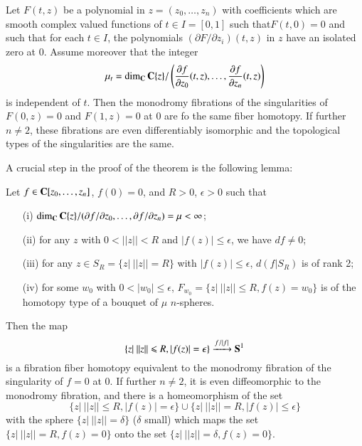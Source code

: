 \begin{thm}\label{art10-thm2.1}
Let $F(t,z)$ be a polynomial in $z = (z_0, \ldots, z_n)$ with coefficients which are smooth complex valued functions of $t \in I = [0,1]$ such that\pageoriginale $F(t, 0) =0$ and such that for each $t \in I$, the polynomials $(\partial F/ \partial z_i) (t,z)$ in $z$ have an isolated zero at 0. Assume moreover that the integer
$$
\mu_t = \dim_{\mathbf{C}} \mathbf{C} \{z\} / \left(\frac{\partial f}{\partial z_0} (t,z) , \ldots, \frac{\partial f}{\partial z_n} (t,z) \right)
$$
is independent of $t$. Then the monodromy fibrations of the singularities of $F (0,z)=0$ and $F(1,z) =0$ at 0 are fo the same fiber homotopy. If further $n \neq 2$, these fibrations are even differentiably isomorphic and the topological types of the singularities are the same.
\end{thm}

A crucial step in the proof of the theorem is the following lemma:

\begin{lemma}\label{art10-lem2.2}
Let $f \in \mathbf{C}[z_0, \ldots, z_n]$, $f(0) =0$, and $R >0$, $\epsilon > 0$ such that 
\begin{itemize}
\item[\rm (i)] $\dim_{\mathbf{C}} \mathbf{C} \{z\} / (\partial f / \partial z_0, \ldots, \partial f / \partial z_n) = \mu < \infty$;

\item[\rm (ii)] for any $z$ with $0 <  ||z|| < R$ and $|f(z)| \leqslant \epsilon$, we have $df\neq 0$;

\item[\rm (iii)] for any $z \in S_R = \{z |~ ||z|| = R\}$ with $|f(z)| \leqslant \epsilon$, $d (f|S_R)$ is of rank 2;

\item[\rm (iv)] for some $w_0$ with $0 < |w_0|\leqslant \epsilon$, $F_{w_0} = \{z| ~ ||z|| \leqslant R, f(z) = w_0\}$ is of the homotopy type of a bouquet of $\mu$ $n$-spheres.
 \end{itemize}

Then the map
\begin{equation}
\{z | ~ ||z|| \leqslant R, |f(z)| = \epsilon \} \xrightarrow{f/|f|} \mathbf{S}^1 \label{art10-A}
\end{equation}
is a fibration fiber homotopy equivalent to the monodromy fibration of the singularity of $f=0$ at 0. If further $n \neq 2$, it is even diffeomorphic to the monodromy fibration, and there is a homeomorphism of the set
$$
\{z| ~ ||z|| \leqslant R, | f(z)| = \epsilon \} \cup \{ z| ~ ||z|| = R , |f(z)|\leqslant \epsilon \}
$$
with the sphere $\{z| ~||z|| = \delta\}$ ($\delta$ small) which maps the set $\{z|~||z|| = R, f(z) =0\} $ onto the set $\{z|~ ||z|| = \delta, f(z)=0 \}$.
\end{lemma}

